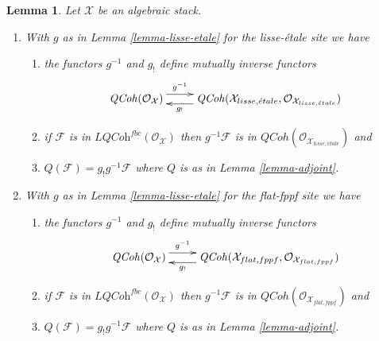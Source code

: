 \documentclass{stacks-project}
\theoremstyle{plain}
\newtheorem{lemma}[subsection]{Lemma}
\theoremstyle{definition}
\theoremstyle{remark}
\numberwithin{equation}{subsection}
\def\etale{{\acute{e}tale}}
\def\QCoh{\mathit{QCoh}}
\begin{document}
\begin{lemma}
\label{lemma-quasi-coherent}
Let $\mathcal{X}$ be an algebraic stack.
\begin{enumerate}
\item With $g$ as in Lemma \ref{lemma-lisse-etale}
for the lisse-\'etale site we have
\begin{enumerate}
\item the functors $g^{-1}$ and $g_!$ define mutually inverse functors
$$
\xymatrix{
\QCoh(\mathcal{O}_\mathcal{X}) \ar@<1ex>[r]^-{g^{-1}} &
\QCoh(\mathcal{X}_{lisse,\etale},
\mathcal{O}_{\mathcal{X}_{lisse,\etale}}) \ar@<1ex>[l]^-{g_!}
}
$$
\item if $\mathcal{F}$ is in $\textit{LQCoh}^{fbc}(\mathcal{O}_\mathcal{X})$
then $g^{-1}\mathcal{F}$ is in
$\QCoh(\mathcal{O}_{\mathcal{X}_{lisse,\etale}})$ and
\item $Q(\mathcal{F}) = g_!g^{-1}\mathcal{F}$ where $Q$ is as in
Lemma \ref{lemma-adjoint}.
\end{enumerate}
\item With $g$ as in Lemma \ref{lemma-lisse-etale}
for the flat-fppf site we have
\begin{enumerate}
\item the functors $g^{-1}$ and $g_!$ define mutually inverse functors
$$
\xymatrix{
\QCoh(\mathcal{O}_\mathcal{X}) \ar@<1ex>[r]^-{g^{-1}} &
\QCoh(\mathcal{X}_{flat,fppf},
\mathcal{O}_{\mathcal{X}_{flat,fppf}}) \ar@<1ex>[l]^-{g_!}
}
$$
\item if $\mathcal{F}$ is in $\textit{LQCoh}^{fbc}(\mathcal{O}_\mathcal{X})$
then $g^{-1}\mathcal{F}$ is in
$\QCoh(\mathcal{O}_{\mathcal{X}_{flat,fppf}})$
and
\item $Q(\mathcal{F}) = g_!g^{-1}\mathcal{F}$ where $Q$ is as in
Lemma \ref{lemma-adjoint}.
\end{enumerate}
\end{enumerate}
\end{lemma}
\end{document}
